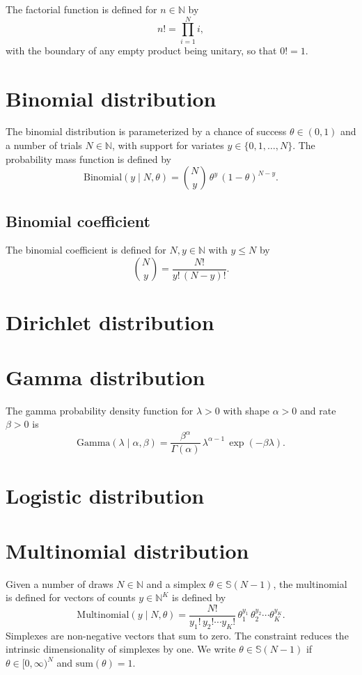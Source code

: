 \documentclass[11pt]{report}
\begin{document}
The factorial function is defined for $n \in \mathbb{N}$ by
\[
  n! = \prod_{i = 1}^N i,
\]
with the boundary of any empty product being unitary, so that $0! =
1$.

\section{Binomial distribution}

The binomial distribution is parameterized by a chance of success
$\theta \in (0, 1)$ and a number of trials $N \in \mathbb{N}$, with
support for variates $y \in \{0, 1, \ldots, N\}$.  The probability mass
function is defined by
\[
  \textrm{Binomial}(y \mid N, \theta)
  = \binom{N}{y} \, \theta^y \, (1 - \theta)^{N - y}.
\]

\subsection{Binomial coefficient}

The binomial coefficient is defined for $N, y \in \mathbb{N}$ with $y
\leq N$ by
\[
  \binom{N}{y} = \frac{N!}{y! \, (N - y)!}.
\]

\section{Dirichlet distribution}

\section{Gamma distribution}

The gamma probability density function for $\lambda > 0$
with shape $\alpha > 0$ and rate $\beta > 0$ is
\[
  \textrm{Gamma}(\lambda \mid \alpha, \beta)
  = \frac{\beta^{\alpha}}{\Gamma(\alpha)}
  \, \lambda^{\alpha - 1}
  \, \exp(-\beta \lambda).
\]


\section{Logistic distribution}

\section{Multinomial distribution}

Given a number of draws $N \in \mathbb{N}$ and a simplex
$\theta \in \mathbb{S}(N-1)$, the multinomial is defined for vectors
of counts $y \in \mathbb{N}^K$ is defined by
%
\[
  \textrm{Multinomial}(y \mid N, \theta)
  = \frac{N!}{y_1! \, y_2! \cdots y_K!} \, \theta_1^{y_1} \, \theta_2^{y_2} \cdots \theta_K^{y_K}.
\]
Simplexes are non-negative vectors that sum to zero.  The constraint
reduces the intrinsic dimensionality of simplexes by one.  We
write
$\theta \in \mathbb{S}(N - 1)$ if $\theta \in [0, \infty)^N$
and $\textrm{sum}(\theta) = 1$.
\end{document}

